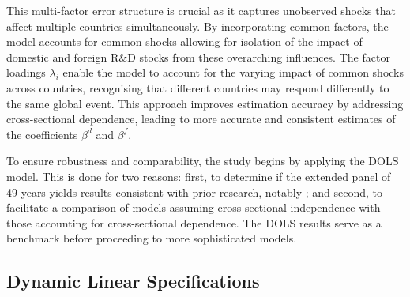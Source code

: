 \documentclass[12pt]{article}
\begin{document}
This multi-factor error structure is crucial as it captures unobserved shocks that affect multiple countries simultaneously. By incorporating common factors, the model accounts for common shocks allowing for isolation of the impact of domestic and foreign R\&D stocks from these overarching influences. The factor loadings $\lambda_i$ enable the model to account for the varying impact of common shocks across countries, recognising that different countries may respond differently to the same global event. This approach improves estimation accuracy by addressing cross-sectional dependence, leading to more accurate and consistent estimates of the coefficients $\beta^d$ and $\beta^f$.

To ensure robustness and comparability, the study begins by applying the \citet{Pedroni2004} DOLS model. This is done for two reasons: first, to determine if the extended panel of 49 years yields results consistent with prior research, notably \citet{Coe2009}; and second, to facilitate a comparison of models assuming cross-sectional independence with those accounting for cross-sectional dependence. The DOLS results serve as a benchmark before proceeding to more sophisticated models. 

\subsection{Dynamic Linear Specifications}
\end{document}
